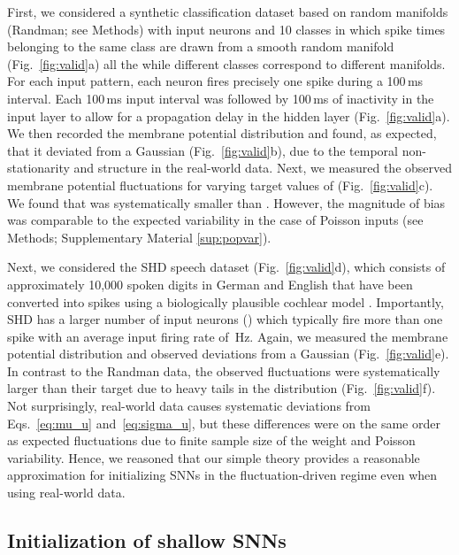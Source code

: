 \documentclass[11pt,a4paper]{article}
\begin{document}
First, we considered a synthetic classification dataset based on random manifolds \citep{Zenke2021-zg} (Randman; see Methods) with  input neurons and 10 classes in which spike times belonging to the same class are drawn from a smooth random manifold (Fig.~\ref{fig:valid}a) all the while different classes
correspond to different manifolds.
For each input pattern, each neuron fires precisely one spike during a 100\,ms
interval.
Each 100\,ms input interval was followed by 100\,ms of inactivity in the input
layer to allow for a propagation delay in the hidden layer
(Fig.~\ref{fig:valid}a).
We then recorded the membrane potential distribution and found, 
as expected, that it deviated from a Gaussian (Fig.~\ref{fig:valid}b), due to the temporal
non-stationarity and structure in the real-world data.
Next, we measured the observed membrane potential fluctuations 
for varying target values of  (Fig.~\ref{fig:valid}c).
We found that  was systematically smaller than .
However, the magnitude of bias was comparable to the expected variability in
the case of Poisson inputs (see Methods; Supplementary Material
\ref{sup:popvar}).

Next, we considered the \ac{SHD} speech dataset (Fig.~\ref{fig:valid}d), which
consists of approximately 10,000 spoken digits in German and English that have
been converted into spikes using a biologically plausible cochlear model
\citep{cramer_heidelberg_2020}.  
Importantly, \ac{SHD} has a larger number of input neurons
() which typically fire more than one
spike with an average input firing rate of \,Hz.
Again, we measured the membrane potential distribution and observed deviations
from a Gaussian (Fig.~\ref{fig:valid}e).
In contrast to the Randman data, the observed fluctuations  were systematically larger than their target  due to heavy
tails in the distribution (Fig.~\ref{fig:valid}f).
Not surprisingly, real-world data causes systematic deviations from Eqs.~\eqref{eq:mu_u}
and~\eqref{eq:sigma_u},
but these differences were on the same order as expected fluctuations due to
finite sample size of the weight and Poisson variability.
Hence, we reasoned that our simple theory provides a reasonable approximation
for initializing \acp{SNN} in the fluctuation-driven regime even when using
real-world data.



\subsection*{Initialization of shallow \acp{SNN}}
\end{document}
